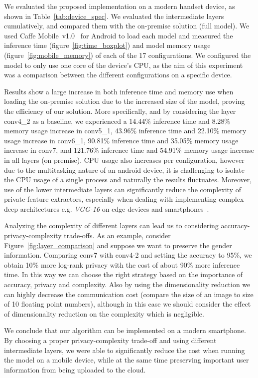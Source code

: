 \documentclass[10pt,journal,compsoc]{IEEEtran}
\begin{document}
We evaluated the proposed implementation on a modern handset device, as shown in Table~\ref{tab:device_spec}. We evaluated the intermediate layers cumulatively, and compared them with the on-premise solution (full model). We used Caffe Mobile~v1.0~\cite{jia2014caffe} for Android to load each model and measured the inference time (figure~\ref{fig:time_boxplot}) and model memory usage (figure~\ref{fig:mobile_memory}) of each of the 17 configurations. We configured the model to only use one core of the device's CPU, as the aim of this experiment was a comparison between the different configurations on a specific device.

Results show a large increase in both inference time and memory use when loading the on-premise solution due to the increased size of the model, proving the efficiency of our solution. More specifically, and by considering the layer conv4\_2 as a baseline, we experienced a 14.44\% inference time and 8.28\% memory usage increase in conv5\_1, 43.96\% inference time and 22.10\% memory usage increase in conv6\_1, 90.81\% inference time and 35.05\% memory usage increase in conv7, and 121.76\% inference time and 54.91\% memory usage increase in all layers (on premise). CPU usage also increases per configuration, however due to the multitasking nature of an android device, it is challenging to isolate the CPU usage of a single process and naturally the results fluctuates. Moreover, use of the lower intermediate layers can significantly reduce the complexity of private-feature extractors, especially when dealing with implementing complex deep architectures e.g. \emph{VGG-16} on edge devices and smartphones~\cite{kim2015compression}. 

Analyzing the complexity of different layers can lead us to considering accuracy-privacy-complexity trade-offs. As an example, consider Figure~\ref{fig:layer_comparison} and suppose we want to preserve the gender information. Comparing conv7 with conv4-2 and setting the accuracy to 95\%, we obtain 10\% more log-rank privacy with the cost of about 90\% more inference time. In this way we can choose the right strategy based on the importance of accuracy, privacy and complexity. Also by using the dimensionality reduction we can highly decrease the communication cost (compare the size of an image to size of 10 floating point numbers), although in this case we should consider the effect of dimensionality reduction on the complexity which is negligible.



We conclude that our algorithm can be implemented on a modern smartphone. By choosing a proper privacy-complexity trade-off and using different intermediate layers, we were able to significantly reduce the cost when running the model on a mobile device, while at the same time preserving important user information from being uploaded to the cloud.
\end{document}
